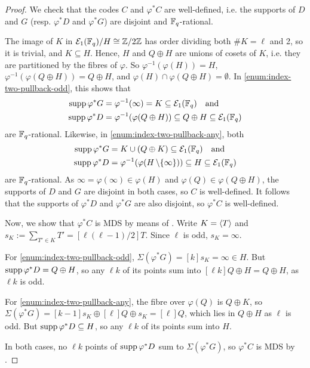 \documentclass[twocolumn, 11pt]{scrartcl}
\begin{document}
\begin{proof}
    We check that the codes $C$ and $\varphi^*C$ are well-defined, i.e. the supports of $D$ and $G$ (resp. $\varphi^*D$ and $\varphi^*G$) are disjoint and $\mathbb{F}_q$-rational.
    
    The image of $K$ in $\mathcal{E}_1(\mathbb{F}_q)/H\cong\mathbb{Z}/2\mathbb{Z}$ has order dividing both $\#K=\ell$ and 2, so it is trivial, and $K\subseteq H$. Hence, $H$ and $Q\oplus H$ are unions of cosets of $K$, i.e. they are partitioned by the fibres of $\varphi$. So $\varphi^{-1}(\varphi(H))=H$, $\varphi^{-1}(\varphi(Q\oplus H))=Q\oplus H$, and $\varphi(H)\cap\varphi(Q\oplus H)=\emptyset$. In \ref{enum:index-two-pullback-odd}, this shows that
    \begin{align*}
        \operatorname{supp} \varphi^*G&=\varphi^{-1}(\infty)=K\subseteq\mathcal{E}_1(\mathbb{F}_q) \quad\text{and} \\
        \operatorname{supp} \varphi^*D&=\varphi^{-1}(\varphi(Q\oplus H))\subseteq Q\oplus H\subseteq\mathcal{E}_1(\mathbb{F}_q)
    \end{align*}
    are $\mathbb{F}_q$-rational. Likewise, in \ref{enum:index-two-pullback-any}, both
    \begin{align*}
        \operatorname{supp} \varphi^*G&=K\cup (Q\oplus K)\subseteq\mathcal{E}_1(\mathbb{F}_q) \quad\text{and} \\
        \operatorname{supp} \varphi^*D&=\varphi^{-1}(\varphi(H\operatorname{\setminus}\{\infty\}))\subseteq H\subseteq\mathcal{E}_1(\mathbb{F}_q)
    \end{align*}
    are $\mathbb{F}_q$-rational. As $\infty=\varphi(\infty)\in\varphi(H)$ and $\varphi(Q)\in\varphi(Q\oplus H)$, the supports of $D$ and $G$ are disjoint in both cases, so $C$ is well-defined. It follows that the supports of $\varphi^*D$ and $\varphi^*G$ are also disjoint, so $\varphi^*C$ is well-defined. 
    
    Now, we show that $\varphi^*C$ is MDS by means of . Write $K=\langle T\rangle$ and $s_K:=\sum_{T'\in K}T'=[\ell(\ell-1)/2]T$. Since $\ell$ is odd, $s_K=\infty$.

    For \ref{enum:index-two-pullback-odd}, $\Sigma(\varphi^*G)=[k]s_K=\infty\in H$. But $\operatorname{supp}\varphi^*D=Q\oplus H$, so any $\ell k$ of its points sum into $[\ell k]Q\oplus H=Q\oplus H$, as $\ell k$ is odd.

    For \ref{enum:index-two-pullback-any}, the fibre over $\varphi(Q)$ is $Q\oplus K$, so $\Sigma(\varphi^*G)=[k-1]s_K\oplus[\ell]Q\oplus s_K=[\ell]Q$, which lies in $Q\oplus H$ as $\ell$ is odd. But $\operatorname{supp}\varphi^*D\subseteq H$, so any $\ell k$ of its points sum into $H$.

    In both cases, no $\ell k$ points of $\operatorname{supp}\varphi^*D$ sum to $\Sigma(\varphi^*G)$, so $\varphi^*C$ is MDS by .
\end{proof}
\end{document}
